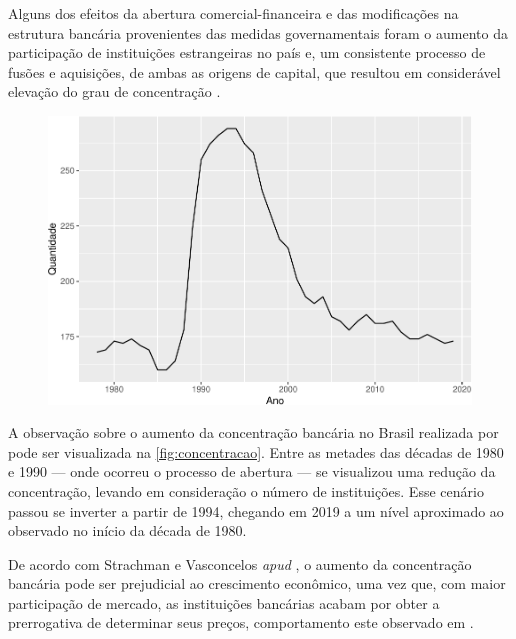 \documentclass[12pt,openright,oneside,a4paper,chapter=TITLE,section=TITLE,subsection=Title,english,french,spanish,portugues,sumario=tradicional]{04-class-files/abntex2}
\begin{document}
Alguns dos efeitos da abertura comercial-financeira e das modificações na estrutura bancária provenientes das medidas governamentais foram o aumento da participação de instituições estrangeiras no país e, um consistente processo de fusões e aquisições, de ambas as origens de capital, que resultou em considerável elevação do grau de concentração \cite{camargo:2009}.

\begin{figure}

\begin{center}\includegraphics{12-exportedfigures/concetration-1} \end{center}
\label{fig:concentracao}
\end{figure}

A observação sobre o aumento da concentração bancária no Brasil realizada por \textcite{camargo:2009} pode ser visualizada na \autoref{fig:concentracao}. Entre as metades das décadas de 1980 e 1990 --- onde ocorreu o processo de abertura --- se visualizou uma redução da concentração, levando em consideração o número de instituições. Esse cenário passou se inverter a partir de 1994, chegando em 2019 a um nível aproximado ao observado no início da década de 1980.

De acordo com Strachman e Vasconcelos \emph{apud} \textcite{camargo:2009}, o aumento da concentração bancária pode ser prejudicial ao crescimento econômico, uma vez que, com maior participação de mercado, as instituições bancárias acabam por obter a prerrogativa de determinar seus preços, comportamento este observado em \textcite{klein:1971}.
\end{document}
